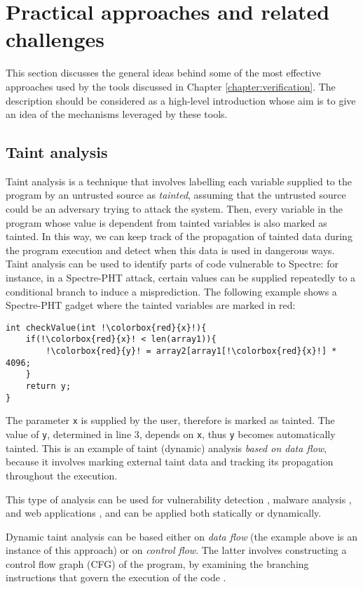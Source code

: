 \documentclass[12pt,a4paper]{book}
\theoremstyle{definition}
\begin{document}
	\section{Practical approaches and related challenges}
	This section discusses the general ideas behind some of the most effective approaches used by the tools discussed in Chapter \ref{chapter:verification}. The description should be considered as a high-level introduction whose aim is to give an idea of the mechanisms leveraged by these tools.
	\subsection{Taint analysis}\label{sec:taint}
	Taint analysis is a technique that involves labelling each variable supplied to the program by an untrusted source as \textit{tainted}, assuming that the untrusted source could be an adversary trying to attack the system.
	Then, every variable in the program whose value is dependent from tainted variables is also marked as tainted. In this way, we can keep track of the propagation of tainted data during the program execution and detect when this data is used in dangerous ways. Taint analysis can be used to identify parts of code vulnerable to Spectre: for instance, in a Spectre-PHT attack, certain values can be supplied repeatedly to a conditional branch to induce a misprediction. The following example shows a Spectre-PHT gadget where the tainted variables are marked in red:
	
	\begin{lstlisting}[escapechar=!]
int checkValue(int !\colorbox{red}{x}!){
	if(!\colorbox{red}{x}! < len(array1)){
		!\colorbox{red}{y}! = array2[array1[!\colorbox{red}{x}!] * 4096;
	}
	return y;
}
	\end{lstlisting}
	The parameter \texttt{x} is supplied by the user, therefore is marked as tainted. The value of \texttt{y}, determined in line 3, depends on \texttt{x}, thus \texttt{y} becomes automatically tainted. This is an example of taint (dynamic) analysis \textit{based on data flow}, because it involves marking external taint data and tracking its propagation throughout the execution.
	
	This type of analysis can be used for vulnerability detection \cite{Newsome2005}, malware analysis \cite{Bayer2009} \cite{Yin2007}, and web applications \cite{Balzarotti2008} \cite{NguyenTuong2005}, and can be applied both statically or dynamically.
	
	Dynamic taint analysis can be based either on \textit{data flow} (the example above is an instance of this approach) or on \textit{control flow}. The latter involves constructing a control flow graph (CFG) of the program, by examining the branching instructions that govern the execution of the code \cite{Dai2018}.
	
\end{document}
